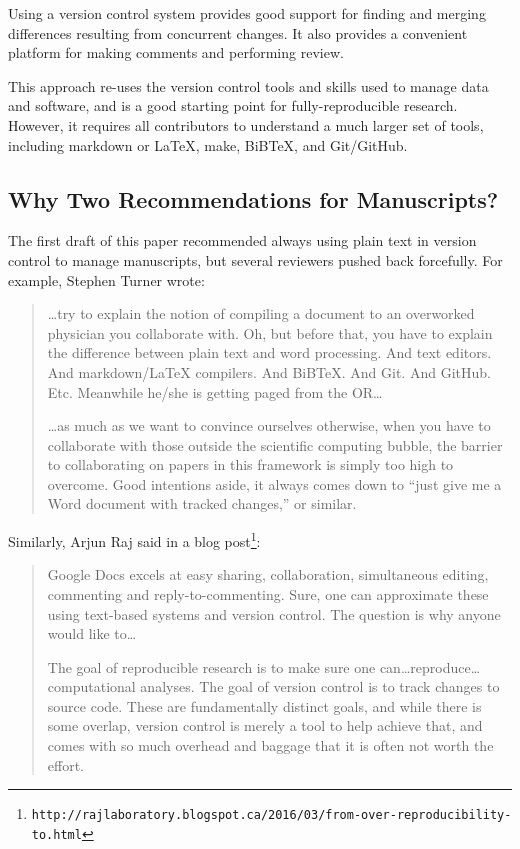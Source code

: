 \documentclass[10pt,letterpaper]{article}
\newcommand{\withurl}[2]{{#1}\footnote{{\texttt{#2}}}}
\begin{document}
Using a version control system provides good support for finding
and merging differences resulting from concurrent changes. It
also provides a convenient platform for making comments and
performing review.

This approach re-uses the version control tools and skills used to
manage data and software, and is a good starting point for
fully-reproducible research. However, it requires all contributors to
understand a much larger set of tools, including markdown or LaTeX,
make, BiBTeX, and Git/GitHub.

\subsection*{Why Two Recommendations for Manuscripts?}

The first draft of this paper recommended always using plain text in
version control to manage manuscripts, but several reviewers pushed
back forcefully. For example, Stephen Turner wrote:

\begin{quote}
{\ldots}try to explain the notion of compiling a document to an
overworked physician you collaborate with. Oh, but before that, you
have to explain the difference between plain text and word
processing. And text editors. And markdown/LaTeX compilers. And
BiBTeX. And Git. And GitHub. Etc. Meanwhile he/she is getting paged
from the OR{\ldots}

{\ldots}as much as we want to convince ourselves otherwise, when you
have to collaborate with those outside the scientific computing
bubble, the barrier to collaborating on papers in this framework is
simply too high to overcome. Good intentions aside, it always comes
down to ``just give me a Word document with tracked changes,'' or
similar.
\end{quote}

Similarly, Arjun Raj said in \withurl{a blog
  post}{http://rajlaboratory.blogspot.ca/2016/03/from-over-reproducibility-to.html}:

\begin{quote}
Google Docs excels at easy sharing, collaboration, simultaneous
editing, commenting and reply-to-commenting. Sure, one can approximate
these using text-based systems and version control. The question is
why anyone would like to{\ldots}

The goal of reproducible research is to make sure one
can{\dots}reproduce{\ldots}computational analyses. The goal of version
control is to track changes to source code. These are fundamentally
distinct goals, and while there is some overlap, version control is
merely a tool to help achieve that, and comes with so much overhead
and baggage that it is often not worth the effort.
\end{quote}
\end{document}
